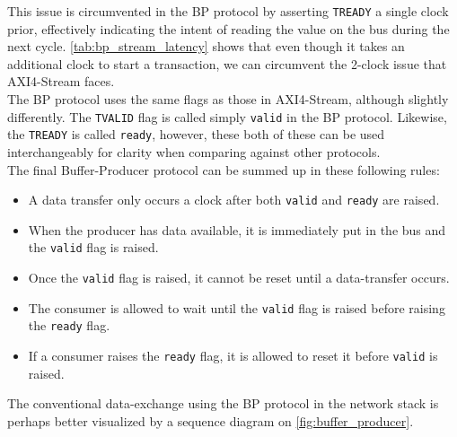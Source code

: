 This issue is circumvented in the BP protocol by asserting \texttt{TREADY} a
single clock prior, effectively indicating the intent of reading the value on
the bus during the next cycle. \autoref{tab:bp_stream_latency} shows that
even though it takes an additional clock to start a transaction, we can
circumvent the 2-clock issue that AXI4-Stream faces.\\

The BP protocol uses the same flags as those in AXI4-Stream, although slightly
differently. The \texttt{TVALID} flag is called simply \texttt{valid} in the
BP protocol. Likewise, the \texttt{TREADY} is called \texttt{ready}, however,
these both of these can be used interchangeably for clarity when comparing
against other protocols.\\

The final Buffer-Producer protocol can be summed up in these following
rules:
\begin{itemize}
	\item A data transfer only occurs a clock after both \texttt{valid} and \texttt{ready}
		are raised.
	\item When the producer has data available, it is immediately put in
		the bus and the \texttt{valid} flag is raised.
	\item Once the \texttt{valid} flag is raised, it cannot be reset until
		a data-transfer occurs.
	\item The consumer is allowed to wait until the \texttt{valid} flag is
		raised before raising the \texttt{ready} flag.
	\item If a consumer raises the \texttt{ready} flag, it is allowed to
		reset it before \texttt{valid} is raised.
\end{itemize}

The conventional data-exchange using the BP protocol in the network
stack is perhaps better visualized by a sequence diagram on
\autoref{fig:buffer_producer}.


